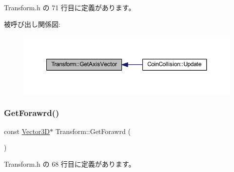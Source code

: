  Transform.\+h の 71 行目に定義があります。

被呼び出し関係図\+:\nopagebreak
\begin{figure}[H]
\begin{center}
\leavevmode
\includegraphics[width=350pt]{class_transform_ad300be34dddc6109ca142452e65aa77d_icgraph}
\end{center}
\end{figure}
\mbox{\label{class_transform_a25e4832e15334d74ff847f0ff0b3564f}} 
\subsubsection{\texorpdfstring{Get\+Forawrd()}{GetForawrd()}}
{\footnotesize\ttfamily const \mbox{\hyperlink{class_vector3_d}{Vector3D}}$\ast$ Transform\+::\+Get\+Forawrd (\begin{DoxyParamCaption}{ }\end{DoxyParamCaption})\hspace{0.3cm}{\ttfamily [inline]}}



 Transform.\+h の 68 行目に定義があります。

